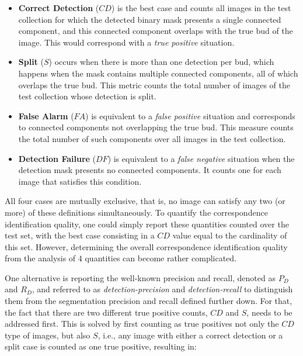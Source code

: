 \documentclass[a4paper,authoryear,review]{elsarticle}
\begin{document}
	\begin{itemize}
		\item \textbf{Correct Detection} ($CD$) is the best case and counts all images in the test collection for which the detected binary mask presents a single connected component, and this connected component overlaps with the true bud of the image. This would correspond with a \emph{true positive} situation.
		
		\item \textbf{Split} ($S$) occurs when there is more than one detection per bud, which happens  when the mask contains multiple connected components, all of which overlaps the true bud. This metric counts the total number of images of the test collection whose detection is split.
		
		\item \textbf{False Alarm} ($FA$) is equivalent to a \emph{false positive} situation and corresponds to connected components not overlapping the true bud. This measure counts the total number of such components over all images in the test collection.
		
		\item \textbf{Detection Failure} ($DF$) is equivalent to a \emph{false negative} situation when the detection mask presents no connected components. It counts one for each image that satisfies this condition.
	\end{itemize}
	
	All four cases are mutually exclusive, that is, no image can satisfy any two (or more) of these definitions simultaneously. To quantify the correspondence identification quality, one could simply report these quantities counted over the test set, with the best case consisting in a $CD$ value equal to the cardinality of this set. However, determining the overall correspondence identification quality from the analysis of $4$ quantities can become rather complicated. 
	
	One alternative is reporting the well-known precision and recall, denoted as $P_D$ and $R_D$, and referred to as \emph{detection-precision} and \emph{detection-recall} to distinguish them from the segmentation precision and recall defined further down. For that, the fact that there are two different true positive counts, $CD$ and $S$, needs to be addressed first. This is solved by first counting as true positives not only the $CD$ type of images, but also $S$, i.e., any image with either a correct detection or a split case is counted as one true positive, resulting in:
	
\end{document}
